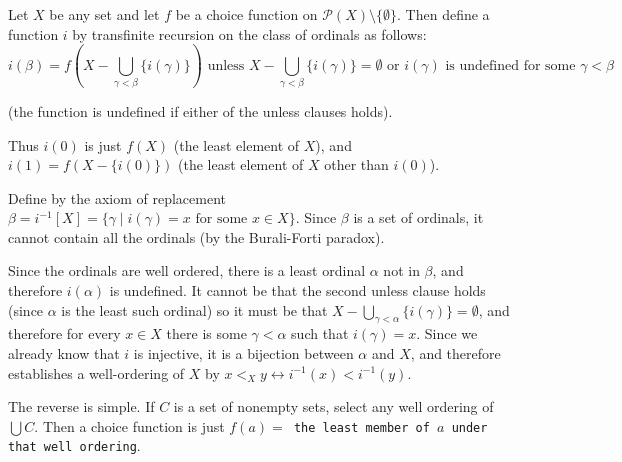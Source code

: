 \documentclass[12pt]{article}
\begin{document}
Let $X$ be any set and let $f$ be a choice function on $\mathcal{P}(X)\setminus\{\emptyset \} $.  Then define a function $i$ by transfinite recursion on the class of ordinals as follows:
$$i(\beta)=f(X-\bigcup_{\gamma<\beta} \{i(\gamma)\})\text{ unless } X-\bigcup_{\gamma<\beta} \{i(\gamma)\}=\emptyset\text{ or }i(\gamma)\text{ is undefined for some }\gamma<\beta$$

(the function is undefined if either of the unless clauses holds).

Thus $i(0)$ is just $f(X)$ (the least element of $X$), and $i(1)=f(X-\{i(0)\})$ (the least element of $X$ other than $i(0)$).

Define by the axiom of replacement $\beta=i^{-1}[X]=\{\gamma\mid i(\gamma)=x \text{ for some }x\in X\}$.  Since $\beta$ is a set of ordinals, it cannot contain all the ordinals (by the Burali-Forti paradox).

Since the ordinals are well ordered, there is a least ordinal $\alpha$ not in $\beta$, and therefore $i(\alpha)$ is undefined.  It cannot be that the second unless clause holds (since $\alpha$ is the least such ordinal) so it must be that $X-\bigcup_{\gamma<\alpha} \{i(\gamma)\}=\emptyset$, and therefore for every $x\in X$ there is some $\gamma<\alpha$ such that $i(\gamma)=x$.  Since we already know that $i$ is injective, it is a bijection between $\alpha$ and $X$, and therefore establishes a well-ordering of $X$ by $x<_Xy\leftrightarrow i^{-1}(x)<i^{-1}(y)$.

The reverse is simple.  If $C$ is a set of nonempty sets, select any well ordering of $\bigcup C$.  Then a choice function is just $f(a)=$\texttt{ the least member of }$a$\texttt{ under that well ordering}.
\end{document}
